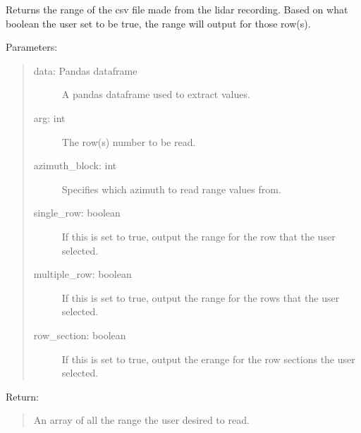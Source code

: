 \documentclass[letterpaper,10pt,english]{sphinxmanual}
\begin{document}
\begin{fulllineitems}
\label{\detokenize{Lidar extraction tool:lidar_extract.get_range}}
Returns the range of the csv file made from the lidar recording. Based on what boolean the user set to be true,
the range will output for those row(s).

Parameters:
\begin{quote}
\begin{description}
\item[{data: Pandas dataframe}] \leavevmode
A pandas dataframe used to extract values.

\item[{arg: int}] \leavevmode
The row(s) number to be read.

\item[{azimuth\_block: int}] \leavevmode
Specifies which azimuth to read range values from.

\item[{single\_row: boolean}] \leavevmode
If this is set to true, output the range for the row that the user selected.

\item[{multiple\_row: boolean}] \leavevmode
If this is set to true, output the range for the rows that the user selected.

\item[{row\_section: boolean}] \leavevmode
If this is set to true, output the erange for the row sections the user selected.

\end{description}
\end{quote}

Return:
\begin{quote}

An array of all the range the user desired to read.
\end{quote}

\end{fulllineitems}

\end{document}
